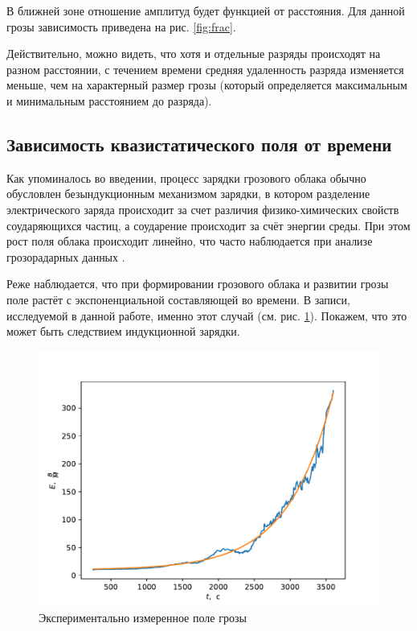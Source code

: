 \documentclass[a4paper,14pt]{extarticle}
\begin{document}
В ближней зоне отношение амплитуд будет функцией от расстояния. Для данной грозы зависимость приведена на рис. \ref{fig:frac}.

Действительно, можно видеть, что хотя и отдельные разряды происходят на разном расстоянии, с течением времени средняя удаленность разряда изменяется меньше, чем на характерный размер грозы (который определяется максимальным и минимальным расстоянием до разряда).


\subsection{Зависимость квазистатического поля от времени}
Как упоминалось во введении, процесс зарядки грозового облака обычно обусловлен безындукционным механизмом зарядки, в котором разделение электрического заряда происходит за счет различия физико-химических свойств соударяющихся частиц, а соударение происходит за счёт энергии среды. При этом рост поля облака происходит линейно, что часто наблюдается при анализе грозорадарных данных \cite{charge}.

Реже наблюдается, что при формировании грозового облака и развитии грозы поле растёт с экспоненциальной составляющей во времени. В записи, исследуемой в данной работе, именно этот случай (см. рис. \ref{fig:charge}). Покажем, что это может быть следствием индукционной зарядки.

\begin{figure}[H]
  \centering
  \includegraphics[]{fig/charge.pdf}  
  \caption{Экспериментально измеренное поле грозы}
  \label{fig:charge}
\end{figure}
\end{document}
